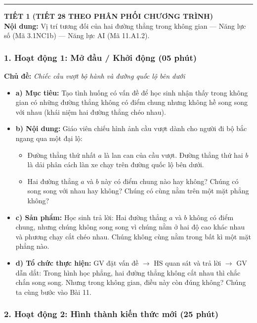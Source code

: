 \documentclass[12pt, a4paper]{article}
\begin{document}
\vspace{0.8em}
\hrule
\vspace{0.8em}

{\large \textbf{TIẾT 1 (TIẾT 28 THEO PHÂN PHỐI CHƯƠNG TRÌNH)}}\\[0.3em]
\textbf{Nội dung:} Vị trí tương đối của hai đường thẳng trong không gian --- Năng lực số (Mã 3.1NC1b) --- Năng lực AI (Mã 11.A1.2).

\subsubsection*{1. Hoạt động 1: Mở đầu / Khởi động (05 phút)}
\textbf{Chủ đề:} \textit{Chiếc cầu vượt bộ hành và đường quốc lộ bên dưới}
\begin{itemize}
    \item \textbf{a) Mục tiêu:} Tạo tình huống có vấn đề để học sinh nhận thấy trong không gian có những đường thẳng không có điểm chung nhưng không hề song song với nhau (khái niệm hai đường thẳng chéo nhau).
    \item \textbf{b) Nội dung:} Giáo viên chiếu hình ảnh cầu vượt dành cho người đi bộ bắc ngang qua một đại lộ:
    \begin{itemize}
        \item Đường thẳng thứ nhất $a$ là lan can của cầu vượt. Đường thẳng thứ hai $b$ là dải phân cách làn xe chạy trên đường quốc lộ bên dưới.
        \item Hai đường thẳng $a$ và $b$ này có điểm chung nào hay không? Chúng có song song với nhau hay không? Chúng có cùng nằm trên một mặt phẳng không?
    \end{itemize}
    \item \textbf{c) Sản phẩm:} Học sinh trả lời: Hai đường thẳng $a$ và $b$ không có điểm chung, nhưng chúng không song song vì chúng nằm ở hai độ cao khác nhau và phương chạy cắt chéo nhau. Chúng không cùng nằm trong bất kì một mặt phẳng nào.
    \item \textbf{d) Tổ chức thực hiện:} GV đặt vấn đề $\to$ HS quan sát và trả lời $\to$ GV dẫn dắt: Trong hình học phẳng, hai đường thẳng không cắt nhau thì chắc chắn song song. Nhưng trong không gian, điều này còn đúng không? Chúng ta cùng bước vào Bài 11.
\end{itemize}

\subsubsection*{2. Hoạt động 2: Hình thành kiến thức mới (25 phút)}
\end{document}
